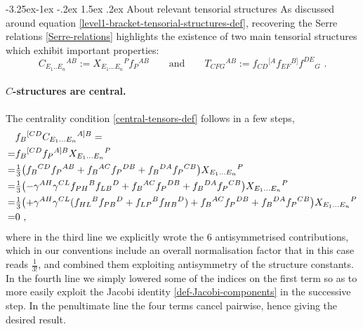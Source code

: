 \documentclass[12pt]{article}
\makeatletter
\renewcommand\subsection{\@startsection{subsection}{2}{\z@}%
                                     {-3.25ex\@plus -1ex \@minus -.2ex}%
                                     {1.5ex \@plus .2ex}%
                                     {\normalfont\bfseries}}
\numberwithin{equation}{section}
\makeatother
\begin{document}
\subsection{About relevant tensorial structures}
As discussed around equation \eqref{level1-bracket-tensorial-structures-def}, recovering the Serre relations \eqref{Serre-relations} highlights the existence of two main tensorial structures which exhibit important properties:
\begin{equation}\label{tensorial-structrures-appendix}
C_{E_{1}..E_{n}}{}^{AB}:=X_{E_{1}...E_{n}}{}^{P}f_{P}{}^{AB}
\qquad \text{and} \qquad
T_{CFG}{}^{AB}:=f_{CD}{}^{[A}f_{EF}{}^{B]}f^{DE}{}_{G}
 \,\, .
\end{equation}
\paragraph{$C$-structures are central.} The centrality condition \eqref{central-tensors-def} follows in a few steps,
\begin{align}\label{vanishing-central-terms}
&f_{B}{}^{[CD}C_{E_{1}...E_{n}}{}^{A]B}=
\notag \\
=&f_{B}{}^{[CD}f_{P}{}^{A]B}X_{E_{1}...E_{n}}{}^{P}
\notag \\
=& \tfrac{1}{3}\bigl( f_{B}{}^{CD}f_{P}{}^{AB}+f_{B}{}^{AC}f_{P}{}^{DB}+f_{B}{}^{DA}f_{P}{}^{CB} \bigr)X_{E_{1}...E_{n}}{}^{P}
\notag \\
=&\tfrac{1}{3}\bigl( -\gamma^{AH}\gamma^{CL}f_{PH}{}^{B}f_{LB}{}^{D}+f_{B}{}^{AC}f_{P}{}^{DB}+f_{B}{}^{DA}f_{P}{}^{CB} \bigr)X_{E_{1}...E_{n}}{}^{P}
\notag \\
=&\tfrac{1}{3}\bigl( +\gamma^{AH}\gamma^{CL}(f_{HL}{}^{B}f_{PB}{}^{D}+f_{LP}{}^{B}f_{HB}{}^{D})+f_{B}{}^{AC}f_{P}{}^{DB}+f_{B}{}^{DA}f_{P}{}^{CB} \bigr)X_{E_{1}...E_{n}}{}^{P}
\notag \\
=&0 \,\, ,
\end{align}
where in the third line we explicitly wrote the 6 antisymmetrised contributions, which in our conventions include an overall normalisation factor that in this case reads $\tfrac{1}{3!}$, and combined them exploiting antisymmetry of the structure constants. In the fourth line we simply lowered some of the indices on the first term so as to more easily exploit the Jacobi identity \eqref{def-Jacobi-components} in the successive step. In the penultimate line the four terms cancel pairwise, hence giving the desired result.
\end{document}
